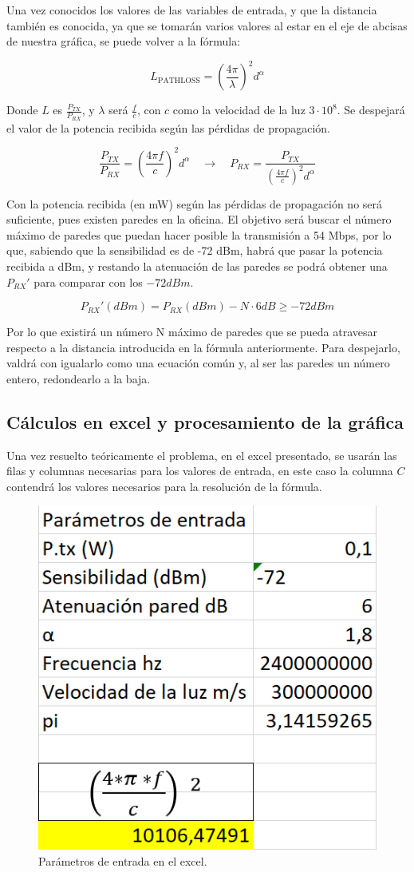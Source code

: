 \documentclass{article}
\begin{document}
Una vez conocidos los valores de las variables de entrada, y que la distancia también es conocida, ya que se tomarán varios valores al estar en el eje de abcisas de nuestra gráfica, se puede volver a la fórmula:

$$L_{\text{PATHLOSS}} = \left(\frac{4\pi}{\lambda}\right)^{2}d^\alpha$$

Donde $L$ es $\frac{P_{TX}}{P_{RX}}$, y $\lambda$ será $\frac{f}{c}$, con $c$ como la velocidad de la luz $3 \cdot 10^8$. Se despejará el valor de la potencia recibida según las pérdidas de propagación.

$$\frac{P_{TX}}{P_{RX}} = \left(\frac{4\pi f}{c}\right)^2 d^\alpha \quad \rightarrow \quad P_{RX}  = \frac{P_{TX}}{\left(\frac{4\pi f}{c}\right)^2 d^\alpha }$$

Con la potencia recibida (en mW) según las pérdidas de propagación no será suficiente, pues existen paredes en la oficina. El objetivo será buscar el número máximo de paredes que puedan hacer posible la transmisión a 54 Mbps, por lo que, sabiendo que la sensibilidad es de -72 dBm, habrá que pasar la potencia recibida a dBm, y restando la atenuación de las paredes se podrá obtener una $P_{RX}'$ para comparar con los $-72dBm$. 

$$P_{RX}' (dBm) = P_{RX}(dBm) - N \cdot 6 dB \geq -72dBm$$ 

\quad

Por lo que existirá un número N máximo de paredes que se pueda atravesar respecto a la distancia introducida en la fórmula anteriormente. Para despejarlo, valdrá con igualarlo como una ecuación común y, al ser las paredes un número entero, redondearlo a la baja.



\subsection{Cálculos en excel y procesamiento de la gráfica}

Una vez resuelto teóricamente el problema, en el excel presentado, se usarán las filas y columnas necesarias para los valores de entrada, en este caso la columna $C$ contendrá los valores necesarios para la resolución de la fórmula.

\begin{figure}[h]
      \centering
      \includegraphics[width=0.35\linewidth]{exceldatos.png}
      \caption{\label{fig:excele} Parámetros de entrada en el excel.}
\end{figure}
\end{document}
